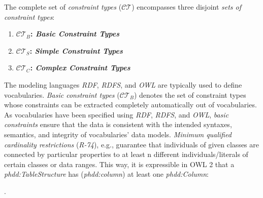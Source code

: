 \documentclass{llncs}
\newcommand{\ms}[1]{\texttt{#1}}
\begin{document}
The complete set of \emph{constraint types} ($\mathcal{CT}$) encompasses three disjoint \emph{sets of constraint types}:
\begin{enumerate}
	\item \textbf{$\mathcal{CT}_{B}$: \emph{Basic Constraint Types}}
	\item \textbf{$\mathcal{CT}_{S}$: \emph{Simple Constraint Types}}
	\item \textbf{$\mathcal{CT}_{C}$: \emph{Complex Constraint Types}}
\end{enumerate}

The modeling languages \emph{RDF}, \emph{RDFS}, and \emph{OWL} are typically used to define vocabularies.
\emph{Basic constraint types} ($\mathcal{CT}_{B}$) 
denotes the set of constraint types whose constraints 
can be extracted completely automatically out of vocabularies.
As vocabularies have been specified using \emph{RDF}, \emph{RDFS}, and \emph{OWL},
\emph{basic constraints} ensure that the data is consistent with the intended syntaxes, semantics, and integrity of vocabularies' data models.
\emph{Minimum qualified cardinality restrictions} (\emph{R-74}), e.g., guarantee that individuals of given classes are connected by particular properties to at least n different individuals/literals of certain classes or data ranges.
This way, it is expressible in OWL 2 that a \emph{phdd:TableStructure} has (\emph{phdd:column}) at least one \emph{phdd:Column}:
\begin{ex}
 .
\end{ex}
\end{document}
